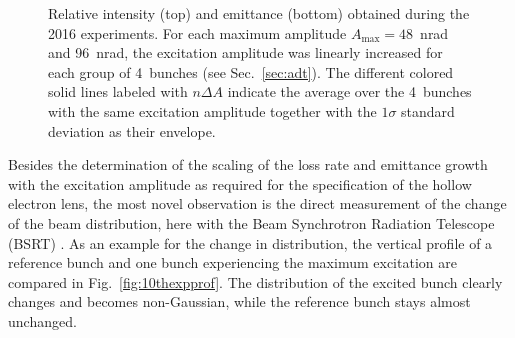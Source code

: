 \documentclass[%
 reprint,
 amsmath,amssymb,
 aps,
prstab,
]{revtex4-1}
\begin{document}
\begin{figure}[h]
\begin{minipage}[t]{0.49\linewidth}
	\end{minipage}	
	\caption{\label{fig:10thexp} Relative intensity (top) and emittance (bottom) obtained during the 2016 experiments. For each maximum amplitude $A_{\mathrm{max}}=48$~nrad and 96~nrad, the excitation amplitude was linearly increased for each group of 4~bunches (see Sec.~\ref{sec:adt}). The different colored solid lines labeled with $n\Delta A$ indicate the average over the 4~bunches with the same excitation amplitude together with the $1\sigma$ standard deviation as their envelope.}
\end{figure}

Besides the determination of the scaling of the loss rate and emittance growth with the excitation amplitude as required for the specification of the hollow electron lens, the most novel observation is the direct measurement of the change of the beam distribution, here with the Beam Synchrotron Radiation Telescope (BSRT) \cite{bsrtprofinj}. As an example for the change in distribution, the vertical profile of a reference bunch and one bunch experiencing the maximum excitation are compared in Fig.~\ref{fig:10thexpprof}. The distribution of the excited bunch clearly changes and becomes non-Gaussian, while the reference bunch stays almost unchanged.
\end{document}
